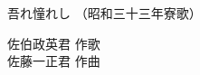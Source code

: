 \documentclass[10pt,b5j]{tarticle} %
\begin{document}
\begin{minipage}[c]{0.7\hsize} %
    \begin{center}
        {\LARGE
            吾れ憧れし %
        }
        {\small 
            （昭和三十三年寮歌） %
        }
    \end{center}
\end{minipage}
\begin{minipage}[c]{0.3\hsize} %
    \begin{flushright} %
        佐伯政英君 作歌\\佐藤一正君 作曲 %
    \end{flushright}
\end{minipage}
\end{document}
